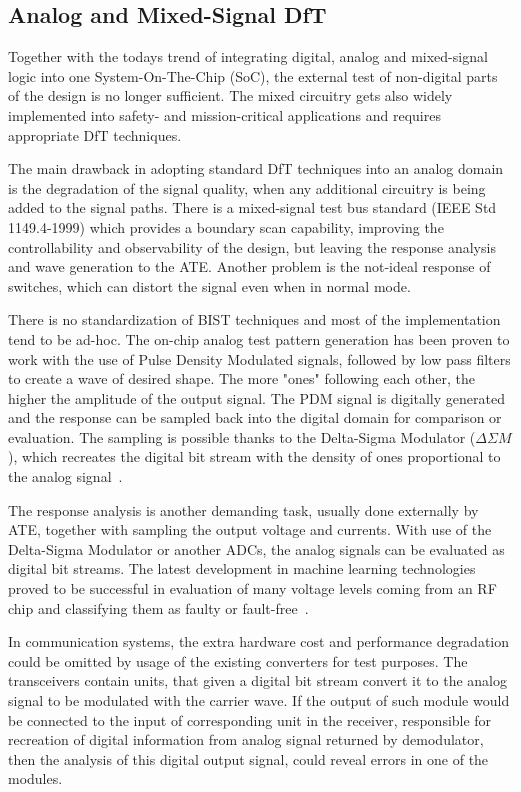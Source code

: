 \subsection{Analog and Mixed-Signal DfT}\label{sub:testa}
Together with the todays trend of integrating digital, analog and mixed-signal logic into one System-On-The-Chip (SoC), the external test of non-digital parts of the design is no longer sufficient. The mixed circuitry gets also widely implemented into safety- and mission-critical applications and requires appropriate DfT techniques.

The main drawback in adopting standard DfT techniques into an analog domain is the degradation of the signal quality, when any additional circuitry is being added to the signal paths. There is a mixed-signal test bus standard (IEEE Std 1149.4-1999) which provides a boundary scan capability, improving the controllability and observability of the design, but leaving the response analysis and wave generation to the ATE. Another problem is the not-ideal response of switches, which can distort the signal even when in normal mode.

There is no standardization of BIST techniques and most of the implementation tend to be ad-hoc. The on-chip analog test pattern generation has been proven to work with the use of Pulse Density Modulated signals, followed by low pass filters to create a wave of desired shape. The more "ones" following each other, the higher the amplitude of the output signal. The PDM signal is digitally generated and the response can be sampled back into the digital domain for comparison or evaluation. The sampling is possible thanks to the Delta-Sigma Modulator ($\Delta \Sigma M$), which recreates the digital bit stream with the density of ones proportional to the analog signal~\cite{book:Grout}.

The response analysis is another demanding task, usually done externally by ATE, together with sampling the output voltage and currents. With use of the Delta-Sigma Modulator or another ADCs, the analog signals can be evaluated as digital bit streams. The latest development in machine learning technologies proved to be successful in evaluation of many voltage levels coming from an RF chip and classifying them as faulty or fault-free~\cite{art:neural}.

In communication systems, the extra hardware cost and performance degradation could be omitted by usage of the existing converters for test purposes. The transceivers contain units, that given a digital bit stream convert it to the analog signal to be modulated with the carrier wave. If the output of such module would be connected to the input of corresponding unit in the receiver, responsible for recreation of digital information from analog signal returned by demodulator, then the analysis of this digital output signal, could reveal errors in one of the modules.